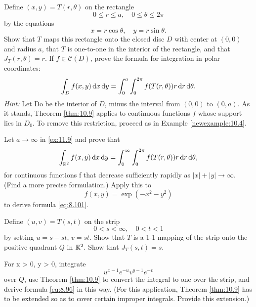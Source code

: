 \begin{myexercise}    
    \label{ex:10.9}
    Define $(x, y) = T(r, \theta)$ on the rectangle
    \begin{equation*}
        0 \leq r \leq a, 
        \quad 
        0 \leq \theta \leq 2\pi
    \end{equation*}
    by the equations
    \begin{equation*}
        x = r \cos \theta , \quad 
        y = r \sin \theta .
    \end{equation*}
    Show that $T$ maps this rectangle onto the closed disc $D$ with center at $(0, 0)$ and radius $a$, 
    that $T$ is one-to-one in the interior of the rectangle, and that $J_T(r, \theta) = r$. 
    If $f \in \mathscr{C}(D)$, prove the formula for integration in polar coordinates:
    \begin{equation*}
        \int_D f(x,y) \d x \d y = 
        \int_{0}^{a} \int_{0}^{2\pi} f(T(r,\theta)) r \d r \d \theta .
    \end{equation*}
    \emph{Hint:} Let Do be the interior of $D$, minus the interval from $(0, 0)$ to $(0, a)$. 
    As it stands, Theorem \ref{thm:10.9} applies to continuous functions $f$ whose support lies in $D_0$. 
    To remove this restriction, proceed as in Example \ref{newexample:10.4}.
\end{myexercise}



\begin{myexercise}    
    \label{ex:10.10}
    Let $a \rightarrow \infty$ in \ref{ex:11.9} and prove that 
    \begin{equation*}
        \int_{\R^2} f(x,y) \d x \d y = 
        \int_{0}^{\infty} \int_{0}^{2\pi} f(T(r,\theta)) r \d r \d \theta ,
    \end{equation*}
    for continuous functions f that decrease sufficiently rapidly as $|x | + | y | \rightarrow \infty$.
    (Find a more precise formulation.) 
    Apply this to
    \begin{equation*}
        f(x, y) = \exp (-x^2 - y^2)
    \end{equation*}
    to derive formula \eqref{eq:8.101}.
\end{myexercise}


\begin{myexercise}    
    \label{ex:10.11}
    Define $(u,v)=T(s,t)$ on the strip
    \begin{equation*}
        0<s<\infty , \quad
        0<t<1
    \end{equation*}
    by setting $u = s - st$, $v = st$. 
    Show that $T$ is a 1-1 mapping of the strip onto the positive quadrant $Q$ in ${\protect\mathbb R}^2$.
    Show that $J_T(s, t) = s$.

    For x > 0, y > 0, integrate
    \begin{equation*}
        u^{x-1} e^{-u} v^{y-1} e^{-v} 
    \end{equation*}
    over $Q$, use Theorem \ref{thm:10.9} to convert the integral to one over the strip, and derive formula \eqref{eq:8.96} in this way.
    (For this application, Theorem \ref{thm:10.9} has to be extended so as to cover certain improper integrals. 
    Provide this extension.)
\end{myexercise}


